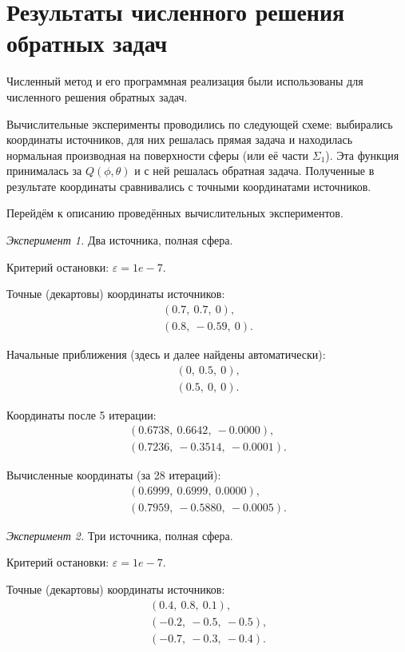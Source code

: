 \section{Результаты численного решения обратных задач}

Численный метод и его программная реализация были использованы для численного решения обратных задач.

Вычислительные эксперименты проводились по следующей схеме: выбирались координаты источников, для них решалась прямая задача и находилась нормальная производная на поверхности сферы (или её части $\Sigma_1$). Эта функция принималась за $Q(\phi, \theta)$ и с ней решалась обратная задача. Полученные в результате координаты сравнивались с точными координатами источников.

Перейдём к описанию проведённых вычислительных экспериментов.

\emph{Эксперимент 1.} Два источника, полная сфера.

Критерий остановки: $\varepsilon = 1e-7$.

Точные (декартовы) координаты источников:
\begin{align}
    (0.7,\ 0.7,\ 0) \text{,}\nonumber\\
    (0.8,\ -0.59,\ 0) \text{.}\nonumber
\end{align}

Начальные приближения (здесь и далее найдены автоматически):
\begin{align}
    (0,\ 0.5,\ 0) \text{,}\nonumber\\
    (0.5,\ 0,\ 0) \text{.}\nonumber
\end{align}

Координаты после 5 итерации:
\begin{align}
    (0.6738,\ 0.6642,\ -0.0000) \text{,}\nonumber\\
    (0.7236,\ -0.3514,\ -0.0001) \text{.}\nonumber
\end{align}

Вычисленные координаты (за 28 итераций):
\begin{align}
    (0.6999,\ 0.6999,\ 0.0000) \text{,}\nonumber\\
    (0.7959,\ -0.5880,\ -0.0005) \text{.}\nonumber
\end{align}

\newpage
\emph{Эксперимент 2.} Три источника, полная сфера.

Критерий остановки: $\varepsilon = 1e-7$.

Точные (декартовы) координаты источников:
\begin{align}
    (0.4,\ 0.8,\ 0.1) \text{,}\nonumber\\
    (-0.2,\ -0.5,\ -0.5) \text{,}\nonumber\\
    (-0.7,\ -0.3,\ -0.4) \text{.}\nonumber
\end{align}

